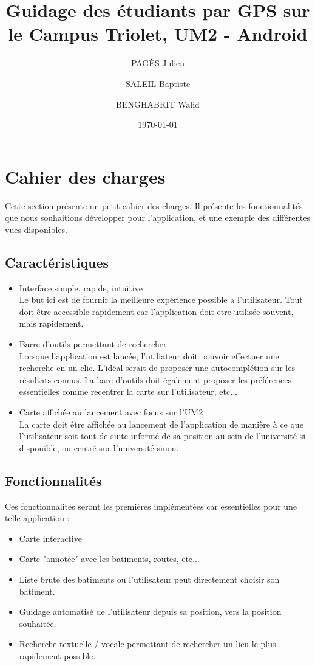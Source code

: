 \documentclass{article}
\title{Guidage des étudiants par GPS sur le Campus Triolet, UM2 - Android}
\author{PAGÈS Julien \and SALEIL Baptiste \and BENGHABRIT Walid}
\date{\today}
\begin{document}
	\maketitle
	\thispagestyle{empty}
	
	\section{Cahier des charges}
	Cette section présente un petit cahier des charges.
	Il présente les fonctionnalités que nous souhaitions développer pour l'application, et une exemple des différentes vues disponibles.
	
	\subsection{Caractéristiques}
	\begin{itemize}
		\item Interface simple, rapide, intuitive \\
			Le but ici est de fournir la meilleure expérience possible a l'utilisateur. Tout doit être accessible rapidement car l'application doit etre utilisée souvent, mais rapidement.
		\item Barre d'outils permettant de rechercher \\
			Lorsque l'application est lancée, l'utiliateur doit pouvoir effectuer une recherche en un clic. L'idéal serait de proposer une autocomplétion sur les résultats connus. La bare d'outils doit également proposer les préférences essentielles comme recentrer la carte sur l'utilisateur, etc...
		\item Carte affichée au lancement avec focus sur l'UM2 \\
			La carte doit être affichée au lancement de l'application de manière à ce que l'utilisateur soit tout de suite informé de sa position au sein de l'université si disponible, ou centré sur l'université sinon.
	\end{itemize}

	\subsection{Fonctionnalités}
	Ces fonctionnalités seront les premières implémentées car essentielles pour une telle application :
	\begin{itemize}
		\item Carte interactive
		\item Carte "annotée" avec les batiments, routes, etc...
		\item Liste brute des batiments ou l'utilisateur peut directement choisir son batiment.
		\item Guidage automatisé de l'utilisateur depuis sa position, vers la position souhaitée.
		\item Recherche textuelle / vocale permettant de rechercher un lieu le plus rapidement possible.
	\end{itemize}
	
\end{document}

